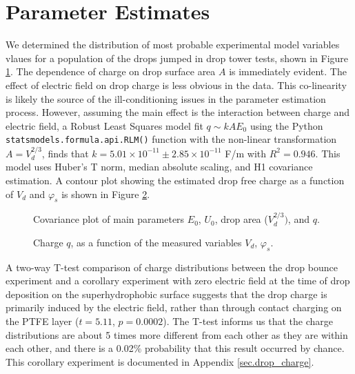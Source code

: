 \documentclass[12pt,a4paper,oneside]{book}
\begin{document}
\section{Parameter Estimates}
We determined the distribution of most probable experimental model variables vlaues for a population of the drops jumped in drop tower tests, shown in Figure \ref{fig:scatter}. The dependence of charge on drop surface area $A$ is immediately evident. The effect of electric field on drop charge is less obvious in the data. This co-linearity is likely the source of the ill-conditioning issues in the parameter estimation process. However, assuming the main effect is the interaction between charge and electric field, a Robust Least Squares model fit $q \sim kAE_0$ using the Python \verb|statsmodels.formula.api.RLM()| function with the non-linear transformation $A = V_d^{2/3}$, finds that $k=5.01 \times 10^{-11} \pm  2.85 \times 10^{-11}$ F/m with $R^2 = 0.946$. This model uses Huber's T norm, median absolute scaling, and H1 covariance estimation. A contour plot showing the estimated drop free charge as a function of $V_d$ and $\varphi_s$ is shown in Figure \ref{fig:charge}.
\begin{figure}[h]
    \centering
    \resizebox{12cm}{!}{}
    \caption{Covariance plot of main parameters $E_0$, $U_0$, drop area ($V_d^{2/3})$, and $q$.\label{fig:scatter}}
\end{figure}
\begin{figure}[h]
    \centering
    
    \caption{Charge $q$, as a function of the measured variables $V_d$, $\varphi_s$.\label{fig:charge}}
\end{figure}

A two-way T-test comparison of charge distributions between the drop bounce experiment and a corollary experiment with zero electric field at the time of drop deposition on the superhydrophobic surface suggests that the drop charge is primarily induced by the electric field, rather than through contact charging on the PTFE layer ($t = 5.11$, $p = 0.0002$). The T-test informs us that the charge distributions are about 5 times more different from each other as they are within each other, and there is a 0.02$\%$ probability that this result occurred by chance. This corollary experiment is documented in Appendix \ref{sec.drop_charge}.
\end{document}
